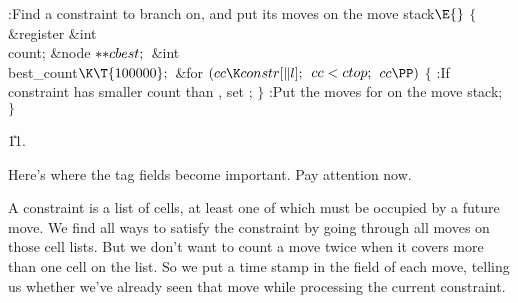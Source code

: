 \B{}:Find a constraint to branch on, and put its moves
on the move stack\X${}\E{}$\6
${}\{{}$\1\6
\&{register} \&{int} \\{count};\6
\&{node} ${}{*}{*}\\{cbest};{}$\6
\&{int} \\{best\_count}${}\K\T{100000};{}$\7
\&{for} ${}(\\{cc}\K\\{constr}[\|l];{}$ ${}\\{cc}<\\{ctop};{}$ ${}\\{cc}\PP){}$%
\5
${}\{{}$\1\6
:If constraint  has smaller count than , set \X;\6
\4${}\}{}$\2\6
:Put the moves for  on the move stack\X;\6
\4${}\}{}$\2\par
\U11.\fi

Here's where the tag fields become important. Pay
attention now.

A constraint is a list of cells, at least one of which must be occupied
by a future move. We find all ways to satisfy the constraint by going through
all moves on those cell lists. But we don't want to count a move twice
when it covers more than one cell on the list. So we put a time stamp in the
 field of each move, telling us whether we've already seen that
move
while processing the current constraint.

